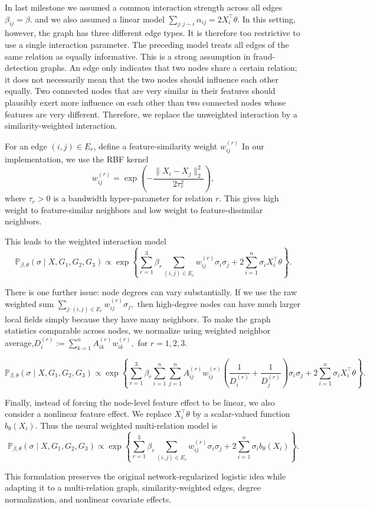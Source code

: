 
In last milestone we assumed a common interaction strength across all edges $\beta_{ij}=\beta.$ and we also assumed a linear model $\sum_{j:j\sim i}\alpha_{ij}=2X_i^\top\theta$.
In this setting, however, the graph has three different edge types. It is therefore too restrictive to use a single interaction parameter. The preceding model treats all edges of the same relation as equally
informative. This is a strong assumption in fraud-detection graphs. An edge only indicates that two nodes share a certain relation; it does not necessarily mean that the two nodes should influence each other equally. Two connected nodes that are very similar in their features should plausibly exert more influence on each other than two connected nodes whose features are very different. Therefore, we replace the unweighted interaction by a similarity-weighted interaction.

For an edge $(i,j)\in E_r$, define a feature-similarity weight $w_{ij}^{(r)}$
In our implementation, we use the RBF kernel
$$
    w_{ij}^{(r)}
    =
    \exp\left(
    -\frac{\|X_i-X_j\|_2^2}{2\tau_r^2}
    \right),
$$
where $\tau_r>0$ is a bandwidth hyper-parameter for relation $r$. This gives high weight to feature-similar neighbors and low weight to feature-dissimilar neighbors.

This leads to the weighted interaction model
$$
    \mathbb P_{\beta,\theta}(\sigma\mid X,G_1,G_2,G_3)
    \propto
    \exp\left\{
    \sum_{r=1}^3
    \beta_r
    \sum_{(i,j)\in E_r}
    w_{ij}^{(r)}\sigma_i\sigma_j
    +
    2\sum_{i=1}^n\sigma_i X_i^\top\theta
    \right\}.
$$

There is one further issue: node degrees can vary substantially. If we use the raw weighted sum $\sum_{j:(i,j)\in E_r}w_{ij}^{(r)}\sigma_j,$ then high-degree nodes can have much larger local fields simply because they
have many neighbors. To make the graph statistics comparable across nodes, we normalize using weighted neighbor average,$D_i^{(r)}:=\sum_{k=1}^nA_{ik}^{(r)}w_{ik}^{(r)},$ for $r=1,2,3.$

\[
    \mathbb P_{\beta,\theta}(\sigma\mid X,G_1,G_2,G_3)
    \propto
    \exp\left\{
    \sum_{r=1}^3
    \beta_r
    \sum_{i=1}^n
    \sum_{j=1}^n
    A_{ij}^{(r)}w_{ij}^{(r)}
    \left(
    \frac{1}{D_i^{(r)}}+\frac{1}{D_j^{(r)}}
    \right)
    \sigma_i\sigma_j
    +
    2\sum_{i=1}^n \sigma_i X_i^\top\theta
    \right\}.
\]

Finally, instead of forcing the node-level feature effect to be linear, we also consider a nonlinear feature effect. We replace $X_i^\top\theta$ by a scalar-valued function $b_\theta(X_i).$ Thus the neural weighted multi-relation model is
$$
    \mathbb P_{\beta,\theta}(\sigma\mid X,G_1,G_2,G_3)\propto\exp\left\{\sum_{r=1}^3\beta_r\sum_{(i,j)\in E_r}w_{ij}^{(r)}\sigma_i\sigma_j+2\sum_{i=1}^n\sigma_i b_\theta(X_i)\right\}.
$$

This formulation preserves the original network-regularized logistic idea while adapting it to a multi-relation graph, similarity-weighted edges, degree normalization, and nonlinear covariate effects.